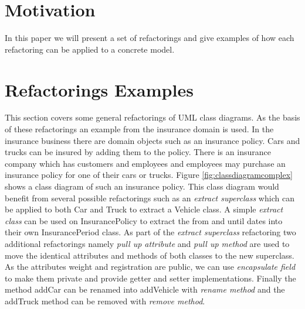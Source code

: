 \documentclass{llncs}
\begin{document}


\section{Motivation}

In this paper we will present a set of refactorings and give examples of how each refactoring can be applied to a concrete model. 


\section{Refactorings Examples}

This section covers some general refactorings of UML class diagrams. As the basis of these refactorings an example from the insurance
domain is used. In the insurance business there are domain objects such as an insurance policy. Cars and trucks can be insured by 
adding them to the policy. There is an insurance company which has customers and employees and employees may purchase an insurance policy 
for one of their cars or trucks. Figure \ref{fig:classdiagramcomplex} shows a class diagram of such an insurance policy. This class 
diagram would benefit from several possible refactorings such as an \textit{extract superclass} which can be applied to both Car and Truck 
to extract a Vehicle class. A simple \textit{extract class} can be used on InsurancePolicy to extract the from and until dates into their
own InsurancePeriod class. As part of the \textit{extract superclass} refactoring two additional refactorings namely \textit{pull up 
attribute} and \textit{pull up method} are used to move the identical attributes and methods of both classes to the new superclass. As the 
attributes weight and registration are public, we can use \textit{encapsulate field} to make them private and provide getter and setter 
implementations. Finally the method addCar can be renamed into addVehicle with \textit{rename method} and the addTruck method can be 
removed with \textit{remove method}.
\end{document}
